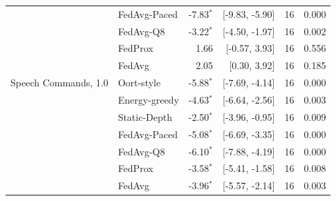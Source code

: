 \begin{tabular}{@{}llrrrr@{}}
 & FedAvg-Paced & -7.83$^{*}$ & [-9.83, -5.90] & 16 & 0.000\\
 & FedAvg-Q8 & -3.22$^{*}$ & [-4.50, -1.97] & 16 & 0.002\\
 & FedProx & 1.66 & [-0.57, 3.93] & 16 & 0.556\\
 & FedAvg & 2.05 & [0.30, 3.92] & 16 & 0.185\\
\midrule
Speech Commands, 1.0 & Oort-style & -5.88$^{*}$ & [-7.69, -4.14] & 16 & 0.000\\
 & Energy-greedy & -4.63$^{*}$ & [-6.64, -2.56] & 16 & 0.003\\
 & Static-Depth & -2.50$^{*}$ & [-3.96, -0.95] & 16 & 0.009\\
 & FedAvg-Paced & -5.08$^{*}$ & [-6.69, -3.35] & 16 & 0.000\\
 & FedAvg-Q8 & -6.10$^{*}$ & [-7.88, -4.19] & 16 & 0.000\\
 & FedProx & -3.58$^{*}$ & [-5.41, -1.58] & 16 & 0.008\\
 & FedAvg & -3.96$^{*}$ & [-5.57, -2.14] & 16 & 0.003\\
\bottomrule
\end{tabular}